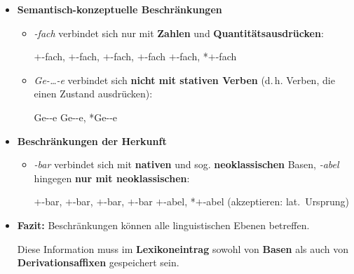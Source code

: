 \begin{frame}

\begin{itemize}
\item \textbf{Semantisch-konzeptuelle Beschränkungen}

\begin{itemize}
\item \emph{-fach} verbindet sich nur mit \textbf{Zahlen} und \textbf{Quantitätsausdrücken}:

\ea {}$+$-fach, $+$-fach, $+$-fach, $+$-fach \vs *$+$-fach, *$+$-fach
\z

\pause

\item \textit{Ge-{\dots}-e} verbindet sich \textbf{nicht mit stativen Verben} (d.\,h. Verben, die einen Zustand ausdrücken):

\ea Ge--e \vs *Ge--e, *Ge--e
\z

\end{itemize}

\pause

\item \textbf{Beschränkungen der Herkunft}

\begin{itemize}
\item \emph{-bar} verbindet sich mit \textbf{nativen} und sog. \textbf{neoklassischen} Basen, \emph{-abel} hingegen \textbf{nur mit neoklassischen}: 

\ea 
\ea {}$+$-bar, $+$-bar, $+$-bar, $+$-bar 
\ex {}$+$-abel, *$+$-abel (akzeptieren: lat.\ Ursprung)
\z 
\z

\end{itemize}

\pause 

\item \textbf{Fazit:} Beschränkungen können alle linguistischen Ebenen betreffen. 

Diese Information muss im \textbf{Lexikoneintrag} sowohl von \textbf{Basen} als auch von \textbf{Derivationsaffixen} gespeichert sein.	
\end{itemize}

\end{frame}


